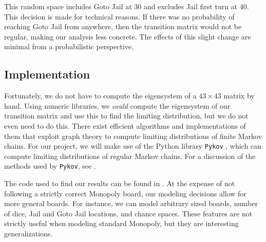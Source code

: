 \documentclass[12pt]{article}
\newcommand{\code}[1]{\texttt{#1}}
\theoremstyle{definition}
\begin{document}
\begin{itemize}
    This random space includes Goto Jail at 30 and excludes Jail first turn at
    40. This decision is made for technical reasons. If there was no
    probability of reaching Goto Jail from anywhere, then the transition matrix
    would not be regular, making our analysis less concrete. The effects of
    this slight change are minimal from a probabilistic perspective.


\end{itemize}

\subsection{Implementation}
\label{sub:implementation}

Fortunately, we do not have to compute the eigensystem of a $43 \times 43$
matrix by hand. Using numeric libraries, we \emph{could} compute the
eigensystem of our transition matrix and use this to find the limiting
distribution, but we do not even need to do this. There exist efficient
algorithms and implementations of them that exploit graph theory to compute
limiting distributions of finite Markov chains. For our project, we will make
use of the Python library \code{Pykov} \citep{scalco2016pykov}, which can
compute limiting distributions of regular Markov chains. For a discussion of
the methods used by \code{Pykov}, see \citet{stewart1994introduction}.

The code used to find our results can be found in
\cite{dougherty-bliss2016boardwalk}. At the expense of not following a strictly
correct Monopoly board, our modeling decisions allow for more general boards.
For instance, we can model arbitrary sized boards, number of dice, Jail and
Goto Jail locations, and chance spaces. These features are not strictly useful
when modeling standard Monopoly, but they are interesting generalizations.
\end{document}
